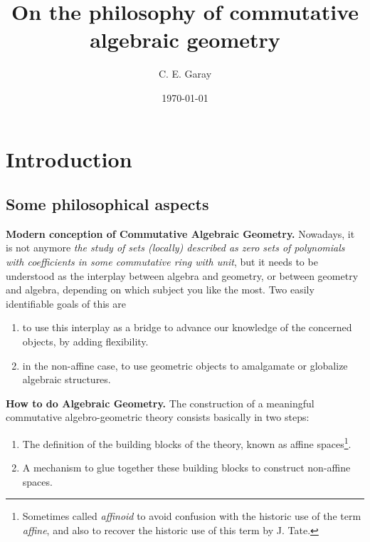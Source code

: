 \documentclass{article}
\date{\today}
\author{C. E. Garay}
\title{On the philosophy of commutative algebraic geometry}
\begin{document}
\maketitle
\section{Introduction}
\subsection{Some philosophical aspects}
{\bf Modern conception of Commutative Algebraic Geometry.} Nowadays, it is not anymore {\it the study of sets (locally) described as zero sets of polynomials with coefficients in some commutative ring with unit}, but it needs to be understood as the interplay between algebra and geometry, or between geometry and algebra, depending on which subject you like the most.  Two easily identifiable  goals of this are 
\begin{enumerate}
\item to use this interplay as a bridge to advance our knowledge of the concerned objects, by adding flexibility.
\item in the non-affine case, to use geometric objects to amalgamate or globalize algebraic structures.
\end{enumerate}
\medskip

\par\noindent
{\bf How to do Algebraic Geometry. }The construction of a meaningful commutative algebro-geometric theory consists basically in two steps:

\begin{enumerate}
\item The definition of the building blocks of the theory, known as affine spaces\footnote{Sometimes called {\it affinoid} to avoid confusion with the historic use of the term {\it affine}, and also to recover the historic use of this term by J. Tate.}.
\item A mechanism to glue together these building blocks to construct non-affine spaces.
\end{enumerate}
\end{document}
